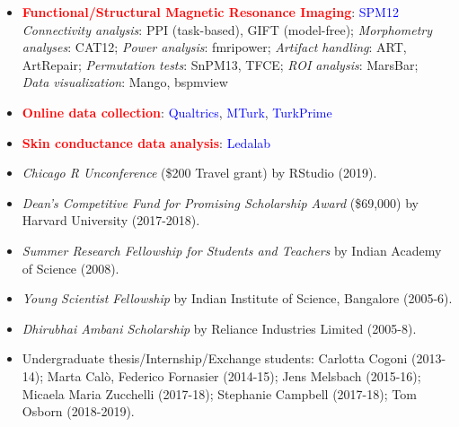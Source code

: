 \documentclass[10pt]{article}
\begin{document}
\begin{itemize}
	
	\item \textcolor{red}{\textbf{Functional/Structural Magnetic Resonance Imaging}}: \textcolor{blue}{SPM12}\\
	\textit{Connectivity analysis}: PPI (task-based), GIFT (model-free); \textit{Morphometry analyses}: CAT12; \textit{Power analysis}: fmripower; \textit{Artifact handling}: ART, ArtRepair; \textit{Permutation tests}: SnPM13, TFCE; \textit{ROI analysis}: MarsBar;\\ 
	\textit{Data visualization}: Mango, bspmview
	
	
	\item \textcolor{red}{\textbf{Online data collection}}: \textcolor{blue}{Qualtrics}, \textcolor{blue}{MTurk}, \textcolor{blue}{TurkPrime}
	
	
	\item \textcolor{red}{\textbf{Skin conductance data analysis}}: \textcolor{blue}{Ledalab}

    \end{itemize}

	
	\begin{itemize}
	\item \textit{Chicago R Unconference} (\$200 Travel grant) by RStudio (2019).
			
	
	\item \textit{Dean's Competitive Fund for Promising Scholarship Award} (\$69,000) by Harvard University (2017-2018).
		
	
	\item {\it Summer Research Fellowship for Students and Teachers} by Indian Academy of Science (2008).
	
	
	\item {\it Young Scientist Fellowship} by Indian Institute of Science, Bangalore (2005-6).
	
	
	\item {\it Dhirubhai Ambani Scholarship} by Reliance Industries Limited (2005-8). 	
	\end{itemize}
	
	
	\begin{itemize}
	\item Undergraduate thesis/Internship/Exchange students: Carlotta Cogoni (2013-14); Marta Cal\`{o}, Federico Fornasier (2014-15); Jens Melsbach (2015-16); Micaela Maria Zucchelli (2017-18); Stephanie Campbell (2017-18); Tom Osborn (2018-2019).
	\end{itemize}
	
\end{document}

